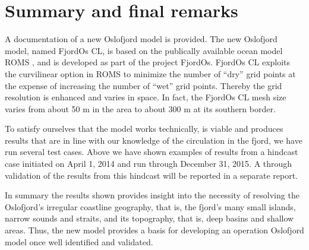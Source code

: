 \newpage
\section{Summary and final remarks}
\label{sec:summa}
A documentation of a new Oslofjord model is provided. The new Oslofjord model, named FjordOs CL, is based on the publically available ocean model ROMS \citep{shche:mcwil:2005,shche:mcwil:2009,haidv:etal:2008}, and is developed as part of the project FjordOs. FjordOs CL exploits the curvilinear option in ROMS to minimize the number of ``dry'' grid points at the expense of increasing the number of ``wet'' grid points. Thereby the grid resolution is enhanced and varies in space. In fact, the FjordOs CL mesh size varies from about 50 m in the {\DR} area to about 300 m at its southern border. 

To satisfy ourselves that the model works technically, is viable and produces results that are in line with our knowledge of the circulation in the fjord, we have run several test cases. Above we have shown examples of results from a hindcast case initiated on April 1, 2014 and run through December 31, 2015. A through validation of the results from this hindcast will be reported in a separate report.

In summary the results shown provides insight into the necessity of resolving the Oslofjord's irregular coastline geography, that is, the fjord's many small islands, narrow sounds and straits, and its topography, that is, deep basins and shallow areas. Thus, the new model provides a basis for developing an operation Oslofjord model once well identified and validated.
